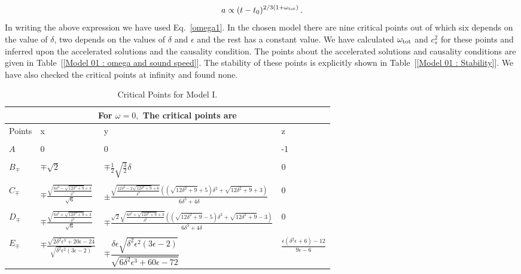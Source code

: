 \documentclass[a4paper,12pt]{article}
\begin{document}
\begin{equation}\label{}
a \propto (t-t_0)^{2/3(1+ \omega_{\rm tot})}\,.
\end{equation}
In writing the above expression we have used Eq.~\eqref{omega1}.
In the chosen model there are nine critical points out of which six depends on the value of $\delta$, two depends on the values of $\delta$ and $\epsilon$ and the rest has a constant value. We have calculated $\omega_{\rm tot}$ and $c_s^2$ for these points and inferred upon the accelerated solutions and the causality condition. The points about the accelerated solutions and causality conditions are given in Table~[\ref{Model 01 : omega and sound speed}]. The stability of these points is explicitly shown in Table~[\ref{Model 01 : Stability}]. We have also checked the critical points at infinity and found none. 
\begin{table}[t!]
\centering
\begin{tabular}{|p{1cm}|p{2.7cm}|p{7.5cm}|p{1.7cm}|}
\hline
\multicolumn{4}{|c|}{For $ \omega = 0,  $ The critical points are }\\ 
\hline
Points &	x & y & z \\
\hline
\hline
&	&&\\
$ A $&	$ 0 $ & $ 0 $  & -1 \\
\hline 
&&&\\
$ B_{\mp}$& $ \mp \sqrt{2} $ & $\mp \frac{1}{2} \sqrt{\frac{3}{2}} \delta  $ & 	0 \\
\hline 
&&&\\
$ C_{\mp} $ & $ \mp\frac{\sqrt{\frac{6 \delta ^2-\sqrt{12 \delta ^2+9}+3}{\delta ^2}}}{\sqrt{6}} $  & $\pm  \frac{\sqrt{\frac{12 \delta ^2-2 \sqrt{12 \delta ^2+9}+6}{\delta ^2}} \left(\left(\sqrt{12 \delta ^2+9}+5\right) \delta ^2+\sqrt{12 \delta ^2+9}+3\right)}{6 \delta ^3+4 \delta } $ & 0\\
\hline
&&&\\
$ D_{\mp} $ & $ \mp \frac{\sqrt{\frac{6 \delta ^2+\sqrt{12 \delta ^2+9}+3}{\delta ^2}}}{\sqrt{6}}$ & $ \mp \frac{\sqrt{2} \sqrt{\frac{6 \delta ^2+\sqrt{12 \delta ^2+9}+3}{\delta ^2}} \left(\left(\sqrt{12 \delta ^2+9}-5\right) \delta ^2+\sqrt{12 \delta ^2+9}-3\right)}{6 \delta ^3+4 \delta } $ & 0\\
\hline
&&&\\	
$ E_{\mp} $ & $ \mp \frac{\sqrt{2 \delta ^2 \epsilon ^3+20 \epsilon -24}}{\sqrt{\delta ^2 \epsilon ^2 (3 \epsilon -2)}}$ & $ \mp \dfrac{\delta  \epsilon  \sqrt{\delta ^2 \epsilon ^2 (3 \epsilon -2)}}{\sqrt{6 \delta ^2 \epsilon ^3+60 \epsilon -72}} $ & $ \frac{\epsilon  \left(\delta ^2 \epsilon +6\right)-12}{9 \epsilon -6} $ \\
\hline
\end{tabular}
\caption{Critical Points for Model I. }
\label{critical point: Model I}
\end{table}
\end{document}
